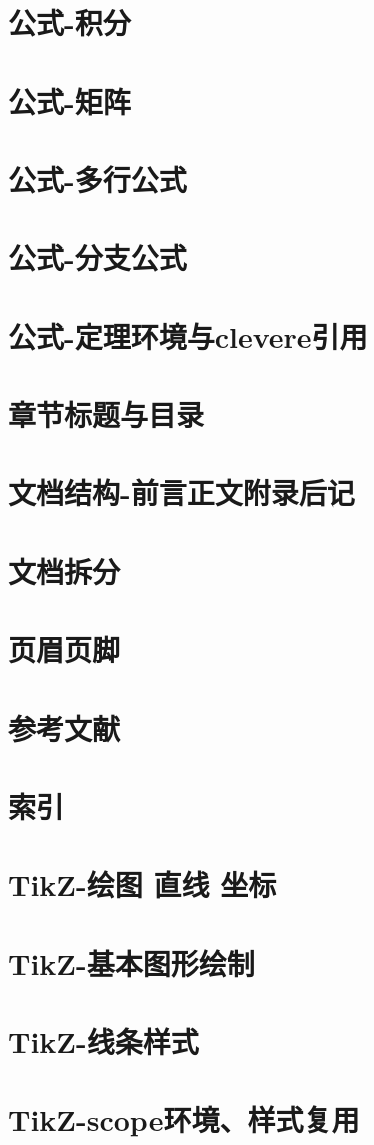 \documentclass[12pt,a4paper]{ctexart}  %
\begin{document}
\section{公式-积分}
\section{公式-矩阵}
\section{公式-多行公式}
\section{公式-分支公式}
\section{公式-定理环境与clevere引用}
\section{章节标题与目录}
\section{文档结构-前言正文附录后记}
\section{文档拆分}
\section{页眉页脚}
\section{参考文献}
\section{索引}
\section{TikZ-绘图 直线 坐标}
\section{TikZ-基本图形绘制}
\section{TikZ-线条样式}
\section{TikZ-scope环境、样式复用}
\end{document}
